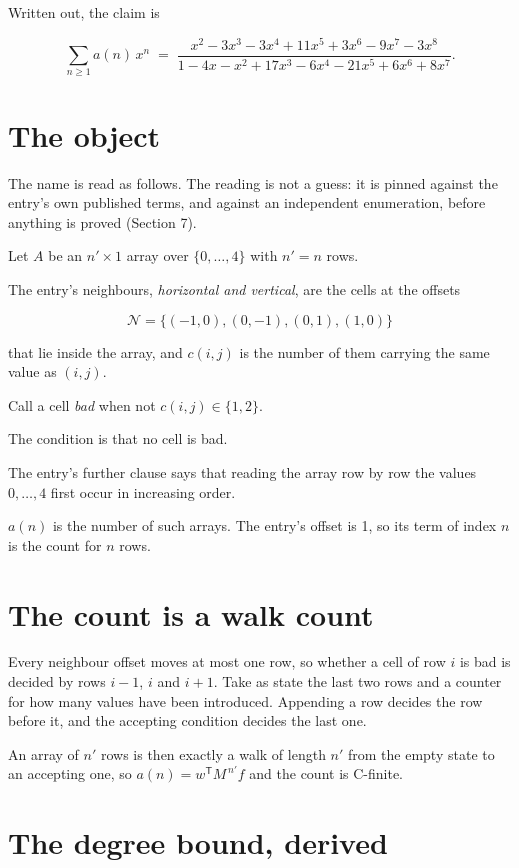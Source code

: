 \documentclass[11pt]{article}
\theoremstyle{definition}
\begin{document}
Written out, the claim is

\[\sum_{n \ge 1} a(n)\,x^n \;=\; \frac{x^{2} - 3x^{3} - 3x^{4} + 11x^{5} + 3x^{6} - 9x^{7} - 3x^{8}}{1 - 4x - x^{2} + 17x^{3} - 6x^{4} - 21x^{5} + 6x^{6} + 8x^{7}}.\]

\section{The object}

The name is read as follows. The reading is not a guess: it is pinned against the entry's own published terms, and against an independent enumeration, before anything is proved (Section 7).

Let $A$ be an $n' \times 1$ array over $\{0,\dots,4\}$ with $n' = n$ rows.

The entry's neighbours, {\itshape horizontal and vertical}, are the cells at the offsets

\[\mathcal{N} = \{(-1,0), (0,-1), (0,1), (1,0)\}\]

that lie inside the array, and $c(i,j)$ is the number of them carrying the same value as $(i,j)$.

Call a cell {\itshape bad} when not $c(i,j) \in \{1, 2\}$.

The condition is that no cell is bad.

The entry's further clause says that reading the array row by row the values $0,\dots,4$ first occur in increasing order.

$a(n)$ is the number of such arrays. The entry's offset is 1, so its term of index $n$ is the count for $n$ rows.

\section{The count is a walk count}

Every neighbour offset moves at most one row, so whether a cell of row $i$ is bad is decided by rows $i-1$, $i$ and $i+1$. Take as state the last two rows and a counter for how many values have been introduced. Appending a row decides the row before it, and the accepting condition decides the last one.

An array of $n'$ rows is then exactly a walk of length $n'$ from the empty state to an accepting one, so $a(n) = w^{\mathsf T}M^{\,n'}f$ and the count is C-finite.

\section{The degree bound, derived}
\end{document}
